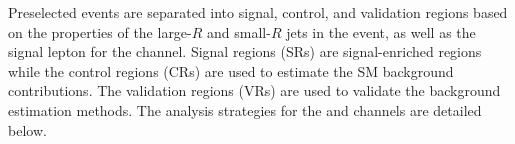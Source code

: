 
Preselected events are separated into signal, control, and validation regions based on the properties of the large-$R$ and small-$R$ jets in the event, as well as the signal lepton for the \onelep channel. Signal regions (SRs) are signal-enriched regions while the control regions (CRs) are used to estimate the SM background contributions. The validation regions (VRs) are used to validate the background estimation methods. The analysis strategies for the \allhad and \onelep channels are detailed below.


